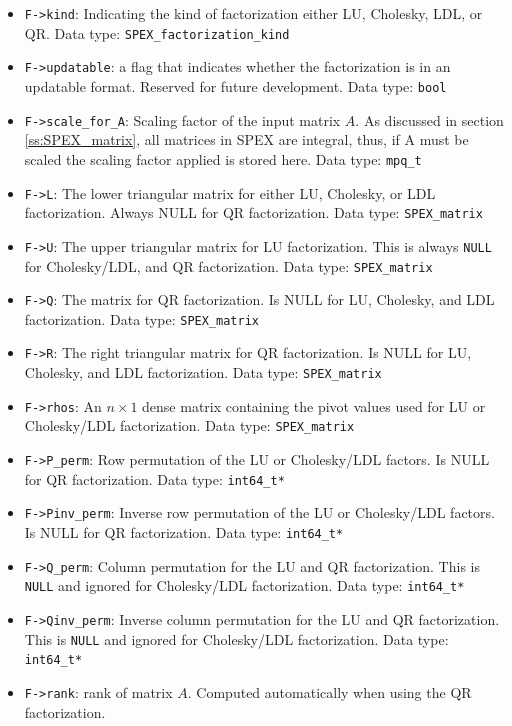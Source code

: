 \documentclass[12pt,oneside]{book}
\theoremstyle{definition}
\begin{document}
\begin{itemize}
\item \verb|F->kind|: Indicating the kind of factorization either LU, Cholesky, LDL, or QR. Data type: \verb|SPEX_factorization_kind|

\item \verb|F->updatable|: a flag that indicates whether the factorization is in an updatable format. Reserved for future development. Data type: \verb|bool|

\item \verb|F->scale_for_A|: Scaling factor of the input matrix $A$. As discussed in section \ref{ss:SPEX_matrix}, all matrices in SPEX are integral, thus, if A must be scaled the scaling factor applied is stored here. Data type: \verb|mpq_t|

\item \verb|F->L|: The lower triangular matrix for either LU, Cholesky, or LDL factorization. Always NULL for QR factorization. Data type: \verb|SPEX_matrix|

\item \verb|F->U|: The upper triangular matrix for LU factorization. This is always \verb|NULL| for Cholesky/LDL, and QR factorization. Data type: \verb|SPEX_matrix|

\item \verb|F->Q|: The matrix for QR factorization. Is NULL for LU, Cholesky, and LDL factorization. Data type: \verb|SPEX_matrix|

\item \verb|F->R|: The right triangular matrix for QR factorization. Is NULL for LU, Cholesky, and LDL factorization. Data type: \verb|SPEX_matrix|

\item \verb|F->rhos|: An $n \times 1$ dense matrix containing the pivot values used for LU or Cholesky/LDL factorization. Data type: \verb|SPEX_matrix|

\item \verb|F->P_perm|: Row permutation of the LU or Cholesky/LDL factors. Is NULL for QR factorization. Data type: \verb|int64_t*|

\item \verb|F->Pinv_perm|: Inverse row permutation of the LU or Cholesky/LDL factors. Is NULL for QR factorization. Data type: \verb|int64_t*|

\item \verb|F->Q_perm|: Column permutation for the LU and QR factorization. This is \verb|NULL| and ignored for Cholesky/LDL factorization. Data type: \verb|int64_t*|

\item \verb|F->Qinv_perm|: Inverse column permutation for the LU and QR factorization. This is \verb|NULL| and ignored for Cholesky/LDL factorization. Data type: \verb|int64_t*|

\item \verb|F->rank|: rank of matrix $A$. Computed automatically when using the QR factorization.
\end{itemize}
\end{document}
